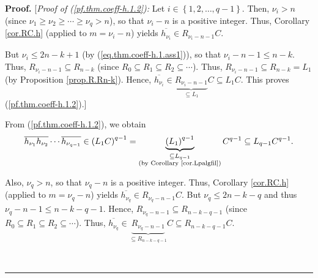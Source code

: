 \documentclass[numbers=enddot,12pt,final,onecolumn,notitlepage]{scrartcl}%
\theoremstyle{definition}
\newenvironment{proof}[1][Proof]{\noindent\textbf{#1.} }{\ \rule{0.5em}{0.5em}}
\begin{document}
\begin{proof}
[\textit{Proof of (\ref{pf.thm.coeff-h.1.2}):} Let $i\in\left\{
1,2,\ldots,q-1\right\}  $. Then, $\nu_{i}>n$ (since $\nu_{1}\geq\nu_{2}%
\geq\cdots\geq\nu_{q}>n$), so that $\nu_{i}-n$ is a positive integer. Thus,
Corollary \ref{cor.RC.h} (applied to $m=\nu_{i}-n$) yields $\overline
{h_{\nu_{i}}}\in R_{\nu_{i}-n-1}C$.

But $\nu_{i}\leq2n-k+1$ (by (\ref{eq.thm.coeff-h.1.ass1})), so that $\nu
_{i}-n-1\leq n-k$. Thus, $R_{\nu_{i}-n-1}\subseteq R_{n-k}$ (since
$R_{0}\subseteq R_{1}\subseteq R_{2}\subseteq\cdots$). Thus, $R_{\nu_{i}%
-n-1}\subseteq R_{n-k}=L_{1}$ (by Proposition \ref{prop.R.Rn-k}). Hence,
$\overline{h_{\nu_{i}}}\in\underbrace{R_{\nu_{i}-n-1}}_{\subseteq L_{1}%
}C\subseteq L_{1}C$. This proves (\ref{pf.thm.coeff-h.1.2}).]

From (\ref{pf.thm.coeff-h.1.2}), we obtain%
\[
\overline{h_{\nu_{1}}}\overline{h_{\nu_{2}}}\cdots\overline{h_{\nu_{q-1}}}%
\in\left(  L_{1}C\right)  ^{q-1}=\underbrace{\left(  L_{1}\right)  ^{q-1}%
}_{\substack{\subseteq L_{q-1}\\\text{(by Corollary \ref{cor.Lpalgfil})}%
}}C^{q-1}\subseteq L_{q-1}C^{q-1}.
\]


Also, $\nu_{q}>n$, so that $\nu_{q}-n$ is a positive integer. Thus, Corollary
\ref{cor.RC.h} (applied to $m=\nu_{q}-n$) yields $\overline{h_{\nu_{q}}}\in
R_{\nu_{q}-n-1}C$. But $\nu_{q}\leq2n-k-q$ and thus $\nu_{q}-n-1\leq n-k-q-1$.
Hence, $R_{\nu_{q}-n-1}\subseteq R_{n-k-q-1}$ (since $R_{0}\subseteq
R_{1}\subseteq R_{2}\subseteq\cdots$). Thus, $\overline{h_{\nu_{q}}}%
\in\underbrace{R_{\nu_{q}-n-1}}_{\subseteq R_{n-k-q-1}}C\subseteq
R_{n-k-q-1}C$.


\end{proof}
\end{document}
